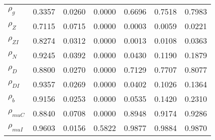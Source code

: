 \begin{center}
\begin{longtable}{lcccccc}
$ {\rho_g}             $	 & 	          0.3357	 & 	          0.0260	 & 	          0.0000	 & 	          0.6696	 & 	          0.7518	 & 	          0.7983 \\ 
$ {\rho_Z}             $	 & 	          0.7115	 & 	          0.0715	 & 	          0.0000	 & 	          0.0003	 & 	          0.0059	 & 	          0.0221 \\ 
$ {\rho_{ZI}}          $	 & 	          0.8274	 & 	          0.0312	 & 	          0.0000	 & 	          0.0013	 & 	          0.0108	 & 	          0.0363 \\ 
$ {\rho_N}             $	 & 	          0.9245	 & 	          0.0392	 & 	          0.0000	 & 	          0.0430	 & 	          0.1190	 & 	          0.1879 \\ 
$ {\rho_D}             $	 & 	          0.8800	 & 	          0.0270	 & 	          0.0000	 & 	          0.7129	 & 	          0.7707	 & 	          0.8077 \\ 
$ {\rho_{DI}}          $	 & 	          0.9357	 & 	          0.0269	 & 	          0.0000	 & 	          0.0402	 & 	          0.1026	 & 	          0.1364 \\ 
$ {\rho_b}             $	 & 	          0.9156	 & 	          0.0253	 & 	          0.0000	 & 	          0.0535	 & 	          0.1420	 & 	          0.2310 \\ 
$ {\rho_{muC}}         $	 & 	          0.8840	 & 	          0.0708	 & 	          0.0000	 & 	          0.8948	 & 	          0.9174	 & 	          0.9286 \\ 
$ {\rho_{muI}}         $	 & 	          0.9603	 & 	          0.0156	 & 	          0.5822	 & 	          0.9877	 & 	          0.9884	 & 	          0.9870 \\ 
\end{longtable}
 \end{center}
